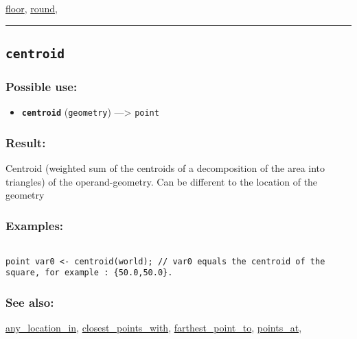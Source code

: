 \documentclass[]{book}
\providecommand{\tightlist}{%
  \setlength{\itemsep}{0pt}\setlength{\parskip}{0pt}}
\theoremstyle{definition}
\theoremstyle{definition}
\theoremstyle{definition}
\theoremstyle{remark}
\begin{document}
\href{OperatorsDH\#floor}{floor}, \href{OperatorsNR\#round}{round},

\begin{center}\rule{0.5\linewidth}{\linethickness}\end{center}

\subsection{\texorpdfstring{\texttt{centroid}}{centroid}}\label{centroid}

\subsubsection{Possible use:}\label{possible-use-81}

\begin{itemize}
\tightlist
\item
  \textbf{\texttt{centroid}} (\texttt{geometry}) ---\textgreater{}
  \texttt{point}
\end{itemize}

\subsubsection{Result:}\label{result-80}

Centroid (weighted sum of the centroids of a decomposition of the area
into triangles) of the operand-geometry. Can be different to the
location of the geometry

\subsubsection{Examples:}\label{examples-63}

\begin{verbatim}
 
point var0 <- centroid(world); // var0 equals the centroid of the square, for example : {50.0,50.0}.
\end{verbatim}

\subsubsection{See also:}\label{see-also-51}

\href{OperatorsAA\#any_location_in}{any\_location\_in},
\href{OperatorsBC\#closest_points_with}{closest\_points\_with},
\href{OperatorsDH\#farthest_point_to}{farthest\_point\_to},
\href{OperatorsNR\#points_at}{points\_at},
\end{document}
